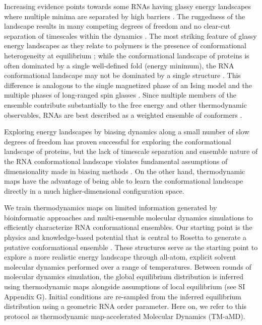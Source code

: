 \documentclass[9pt,twocolumn,twoside]{pnas-new}
\begin{document}
{Increasing evidence points towards some RNAs having glassy energy landscapes where multiple minima are separated by high barriers \cite{kremer-polymer,parisi-RNA,wales-RNA}. The ruggedness of the landscape results in many competing degrees of freedom and no clear-cut separation of timescales within the dynamics \cite{hashimi-glass,wales-RNA,parisi-RNA}. The most striking feature of glassy energy landscapes as they relate to polymers is the presence of conformational heterogeneity at equilibrium \cite{parisi-RNA, kremer-ML};  while the conformational landscape of proteins is often dominated by a single well-defined fold (energy minimum), the RNA conformational landscape may not be dominated by a single structure \cite{hashimi-invisible,hashimi-nmr-dock}. This difference is analogous to the single magnetized phase of an Ising model and the multiple phases of long-ranged spin glasses \cite{parisi-replica-trick, ANNNI,hopfield-network,amit-spin-glass}.  Since multiple members of the ensemble contribute substantially to the free energy and other thermodynamic observables, RNAs are best described as a weighted ensemble of conformers \cite{how-to-think,hashimi-nmr-dock}. 

Exploring energy landscapes by biasing dynamics along a small number of slow degrees of freedom has proven successful for exploring the conformational landscape of proteins, but the lack of timescale separation and ensemble nature of the RNA conformational landscape violates fundamental assumptions of dimensionality made in biasing methods \cite{metadynamics-review}. On the other hand, thermodynamic maps have the advantage of being able to learn the conformational landscape directly in a much higher-dimensional configuration space.

We train thermodynamics maps on limited information generated by bioinformatic approaches and multi-ensemble molecular dynamics simulations to efficiently characterize RNA conformational ensembles. Our starting point is the physics and knowledge-based potential that is central to Rosetta to generate a putative conformational ensemble \cite{rosetta}. These structures serve as the starting point to explore a more realistic energy landscape through all-atom, explicit solvent molecular dynamics performed over a range of temperatures. Between rounds of molecular dynamics simulation, the global equilibrium distribution is inferred using thermodynamic maps alongside assumptions of local equilibrium (see SI Appendix G). Initial conditions are re-sampled from the inferred equilibrium distribution using a geometric RNA order parameter. Here on, we refer to this protocol as thermodynamic map-accelerated Molecular Dynamics (TM-aMD).

}
\end{document}
